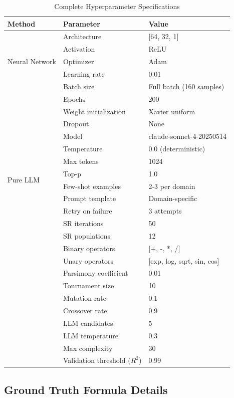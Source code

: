 \begin{table}[htbp]
\centering
\caption{Complete Hyperparameter Specifications}
\label{tab:hyperparameters}
\small
\begin{tabular}{lll}
\toprule
\textbf{Method} & \textbf{Parameter} & \textbf{Value} \\
\midrule
\multirow{5}{*}{Neural Network}
& Architecture & [64, 32, 1] \\
& Activation & ReLU \\
& Optimizer & Adam \\
& Learning rate & 0.01 \\
& Batch size & Full batch (160 samples) \\
& Epochs & 200 \\
& Weight initialization & Xavier uniform \\
& Dropout & None \\
\midrule
\multirow{8}{*}{Pure LLM}
& Model & claude-sonnet-4-20250514 \\
& Temperature & 0.0 (deterministic) \\
& Max tokens & 1024 \\
& Top-p & 1.0 \\
& Few-shot examples & 2-3 per domain \\
& Prompt template & Domain-specific \\
& Retry on failure & 3 attempts \\
\midrule
\multirow{12}{*}{Hybrid v40}
& SR iterations & 50 \\
& SR populations & 12 \\
& Binary operators & [+, -, *, /] \\
& Unary operators & [exp, log, sqrt, sin, cos] \\
& Parsimony coefficient & 0.01 \\
& Tournament size & 10 \\
& Mutation rate & 0.1 \\
& Crossover rate & 0.9 \\
& LLM candidates & 5 \\
& LLM temperature & 0.3 \\
& Max complexity & 30 \\
& Validation threshold ($R^2$) & 0.99 \\
\bottomrule
\end{tabular}
\end{table}

\subsection{Ground Truth Formula Details}

